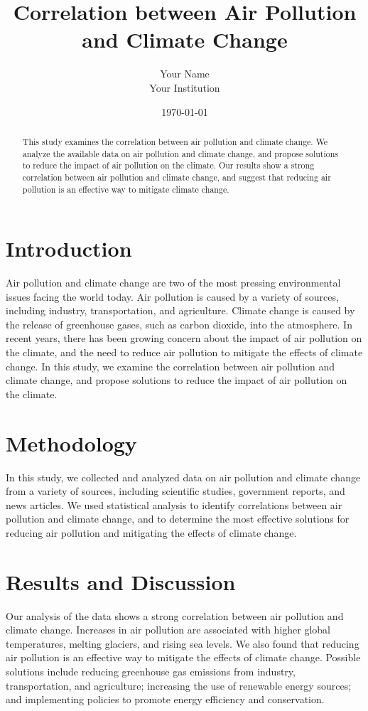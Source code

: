 \documentclass[12pt]{article}
\title{\textbf{\huge Correlation between Air Pollution and Climate Change}}
\author{Your Name\\Your Institution}
\date{\today}
\begin{document}
\maketitle

\begin{abstract}
This study examines the correlation between air pollution and climate change. We analyze the available data on air pollution and climate change, and propose solutions to reduce the impact of air pollution on the climate. Our results show a strong correlation between air pollution and climate change, and suggest that reducing air pollution is an effective way to mitigate climate change. 
\end{abstract}

\tableofcontents
\newpage

\section{Introduction}
\label{sec:intro}
Air pollution and climate change are two of the most pressing environmental issues facing the world today. Air pollution is caused by a variety of sources, including industry, transportation, and agriculture. Climate change is caused by the release of greenhouse gases, such as carbon dioxide, into the atmosphere. In recent years, there has been growing concern about the impact of air pollution on the climate, and the need to reduce air pollution to mitigate the effects of climate change. In this study, we examine the correlation between air pollution and climate change, and propose solutions to reduce the impact of air pollution on the climate.

\section{Methodology}
\label{sec:methodology}
In this study, we collected and analyzed data on air pollution and climate change from a variety of sources, including scientific studies, government reports, and news articles. We used statistical analysis to identify correlations between air pollution and climate change, and to determine the most effective solutions for reducing air pollution and mitigating the effects of climate change. 

\section{Results and Discussion}
\label{sec:results}
Our analysis of the data shows a strong correlation between air pollution and climate change. Increases in air pollution are associated with higher global temperatures, melting glaciers, and rising sea levels. We also found that reducing air pollution is an effective way to mitigate the effects of climate change. Possible solutions include reducing greenhouse gas emissions from industry, transportation, and agriculture; increasing the use of renewable energy sources; and implementing policies to promote energy efficiency and conservation.
\end{document}
